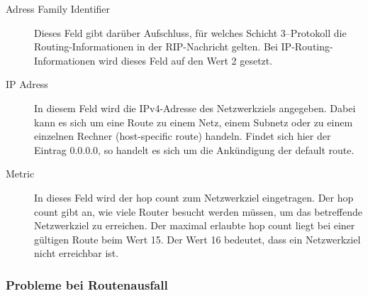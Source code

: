 \documentclass[a4paper,10pt]{scrartcl}
\begin{document}
                    \begin{description}
                        \item[Adress Family Identifier] 
                            Dieses Feld  gibt darüber Aufschluss, für welches Schicht 3–Protokoll die Routing-Informationen in der RIP-Nachricht gelten.
                            Bei IP-Routing-Informationen wird dieses Feld auf den Wert 2 gesetzt. 
                        \item[IP Adress]  In diesem Feld wird die IPv4-Adresse des Netzwerkziels angegeben. Dabei
                            kann es sich um eine Route zu einem Netz, einem Subnetz oder zu einem
                            einzelnen Rechner (host-specific route) handeln. Findet sich hier der
                            Eintrag 0.0.0.0, so handelt es sich um die Ankündigung der default route.
                        \item[Metric] In dieses Feld wird der hop count zum Netzwerkziel eingetragen. Der hop
                            count gibt an, wie viele Router besucht werden müssen, um das betreffende
                            Netzwerkziel zu erreichen. Der maximal erlaubte hop count liegt bei einer
                            gültigen Route beim Wert 15. Der Wert 16 bedeutet, dass ein Netzwerkziel
                            nicht erreichbar ist.
                    \end{description}
                \subsubsection*{Probleme bei Routenausfall}
                    
\end{document}
